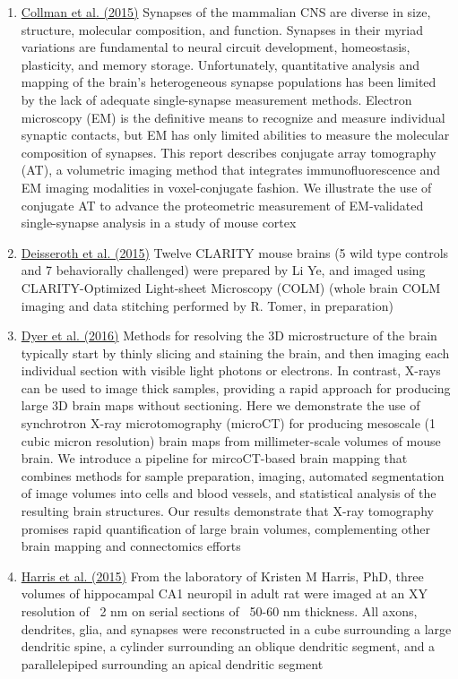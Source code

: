 \documentclass[10pt,colorlinks=true,urlcolor=blue]{moderncv}
\begin{document}
\begin{enumerate}
    \item \href{https://neurodata.io/data/collman15}{Collman et al. (2015)} 
        Synapses of the mammalian CNS are diverse in size, structure, molecular composition, and function. Synapses in their myriad variations are fundamental to neural circuit development, homeostasis, plasticity, and memory storage. Unfortunately, quantitative analysis and mapping of the brain's heterogeneous synapse populations has been limited by the lack of adequate single-synapse measurement methods. Electron microscopy (EM) is the definitive means to recognize and measure individual synaptic contacts, but EM has only limited abilities to measure the molecular composition of synapses. This report describes conjugate array tomography (AT), a volumetric imaging method that integrates immunofluorescence and EM imaging modalities in voxel-conjugate fashion. We illustrate the use of conjugate AT to advance the proteometric measurement of EM-validated single-synapse analysis in a study of mouse cortex%


    \item \href{https://neurodata.io/data/tomer15}{Deisseroth et al. (2015)}
        Twelve CLARITY mouse brains (5 wild type controls and 7 behaviorally challenged) were prepared by Li Ye, and imaged using CLARITY-Optimized Light-sheet Microscopy (COLM) (whole brain COLM imaging and data stitching performed by R. Tomer, in preparation)%

    \item \href{https://neurodata.io/data/xbrain}{Dyer et al.  (2016)}
        Methods for resolving the 3D microstructure of the brain typically start by thinly slicing and staining the brain, and then imaging each individual section with visible light photons or electrons. In contrast, X-rays can be used to image thick samples, providing a rapid approach for producing large 3D brain maps without sectioning. Here we demonstrate the use of synchrotron X-ray microtomography (microCT) for producing mesoscale (1 cubic micron resolution) brain maps from millimeter-scale volumes of mouse brain. We introduce a pipeline for mircoCT-based brain mapping that combines methods for sample preparation, imaging, automated segmentation of image volumes into cells and blood vessels, and statistical analysis of the resulting brain structures. Our results demonstrate that X-ray tomography promises rapid quantification of large brain volumes, complementing other brain mapping and connectomics efforts%

    \item \href{https://neurodata.io/data/kharris15}{Harris et al.  (2015)}
        From the laboratory of Kristen M Harris, PhD, three volumes of hippocampal CA1 neuropil in adult rat were imaged at an XY resolution of ~2 nm on serial sections of ~50-60 nm thickness. All axons, dendrites, glia, and synapses were reconstructed in a cube surrounding a large dendritic spine, a cylinder surrounding an oblique dendritic segment, and a parallelepiped surrounding an apical dendritic segment%


\end{enumerate}
\end{document}
